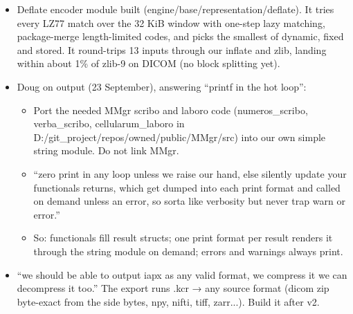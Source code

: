 \begin{itemize}
\begin{itemize}
\begin{enumerate}
\item the head (13 words) with its CRC-64;
\item the offsets and limbs with their CRC-64;
\item the deflated side bytes with a CRC-64 of the inflated bytes;
\item the member tables and names with their CRC-64;
\item EOF.
\end{enumerate}
\item engine\_\allowbreak{}iapx\_\allowbreak{}load takes an optional EngineSideBytes *side (the headers are handed back, and lane\_\allowbreak{}offset rides in it); engine\_\allowbreak{}side\_\allowbreak{}release frees it.
\item Names for the other apx files (flattened, OAPX history, BAPX bodies, IMP key) are still open with Doug. .kfc/.kst/.kgr/.ksd were offered; .ans is for the answer file.
\item The code identifiers still say iapx (engine\_\allowbreak{}iapx\_\allowbreak{}*, iapx\_\allowbreak{}path); rename them to crystal.
\end{itemize}
\item Deflate encoder module built (engine/base/representation/deflate). It tries every LZ77 match over the 32 KiB window with one-step lazy matching, package-merge length-limited codes, and picks the smallest of dynamic, fixed and stored. It round-trips 13 inputs through our inflate and zlib, landing within about 1\% of zlib-9 on DICOM (no block splitting yet).
\item Doug on output (23 September), answering “printf in the hot loop”:

\begin{itemize}
\item Port the needed MMgr scribo and laboro code (numeros\_\allowbreak{}scribo, verba\_\allowbreak{}scribo, cellularum\_\allowbreak{}laboro in D:/git\_\allowbreak{}project/repos/owned/public/MMgr/src) into our own simple string module. Do not link MMgr.
\item “zero print in any loop unless we raise our hand, else silently update your functionals returns, which get dumped into each print format and called on demand unless an error, so sorta like verbosity but never trap warn or error.”
\item So: functionals fill result structs; one print format per result renders it through the string module on demand; errors and warnings always print.
\end{itemize}
\item “we should be able to output iapx as any valid format, we compress it we can decompress it too.” The export runs .kcr → any source format (dicom zip byte-exact from the side bytes, npy, nifti, tiff, zarr...). Build it after v2.
\end{itemize}

